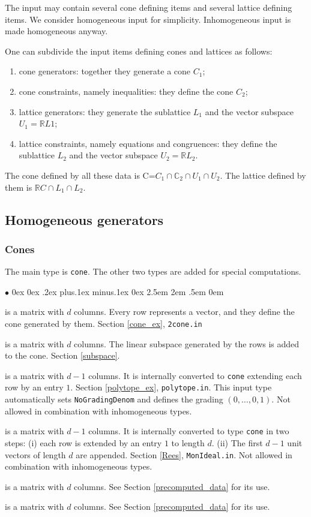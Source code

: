 \documentclass[12pt,a4paper]{scrartcl}
\newcommand{\stdli}{ \topsep0ex \partopsep0ex %
\parsep.2ex plus.1ex minus.1ex \itemsep0ex%
\leftmargin2.5em \labelwidth2em \labelsep.5em \rightmargin0em}%
\renewenvironment{itemize}{\begin{list}{{$\bullet$}}{\stdli}}{\end{list}}
\theoremstyle{definition}
\def\CC{{\mathbb C}}
\def\RR{{\mathbb R}}
\def\itemtt[#1]{\item[\textbf{\ttt{#1}}]}
\def\ttt{\texttt}
\begin{document}
The input may contain several cone defining items and several lattice defining items.  We consider homogeneous input for simplicity. Inhomogeneous input is made homogeneous anyway.

One can subdivide the input items defining cones and lattices as follows:
\begin{enumerate}
	\item cone generators: together they generate a cone $C_1$;
	\item cone constraints, namely inequalities: they define the cone $C_2$;
	\item lattice generators: they generate the sublattice $L_1$ and the vector subspace $U_1=\RR L1$;
	\item lattice constraints, namely equations and congruences: they define the sublattice $L_2$ and the vector subspace $U_2=\RR L_2$.
\end{enumerate}

The cone defined by all these data is C=$C_1\cap\CC_2\cap U_1\cap U_2$. The lattice defined by them is $\RR C\cap L_1\cap L_2$.

\subsection{Homogeneous generators}

\subsubsection{Cones}\label{cone_synt}

The main type is \verb|cone|. The other two types are added for special computations.

\begin{itemize}
	\itemtt[cone] is a matrix with $d$ columns. Every row represents a vector, and they define the cone generated by them. Section \ref{cone_ex}, \verb|2cone.in|
	
	\itemtt[subspace] is a matrix with $d$ columns. The linear subspace generated by the rows is added to the cone. Section \ref{subspace}.
	
	\itemtt[polytope] is a matrix with $d-1$ columns. It is internally converted to \verb|cone| extending each row by an entry $1$.  Section \ref{polytope_ex}, \verb|polytope.in|. This input type automatically sets \verb|NoGradingDenom| and defines the grading $(0,\dots,0,1)$. Not allowed in combination with inhomogeneous types.
	
	\itemtt[rees\_algebra] is a matrix with $d-1$ columns. It is internally converted to type \verb|cone| in two steps: (i) each row is extended by an entry $1$ to length $d$. (ii) The first $d-1$ unit vectors of length $d$ are appended. Section \ref{Rees}, \verb|MonIdeal.in|. Not allowed in combination with inhomogeneous types.
	
	\itemtt[extreme\_rays] is a matrix with $d$ columns. See Section \ref{precomputed_data} for its use.
	
	\itemtt[maximal\_subspace] is a matrix with $d$ columns. See Section \ref{precomputed_data} for its use.
\end{itemize}
\end{document}
